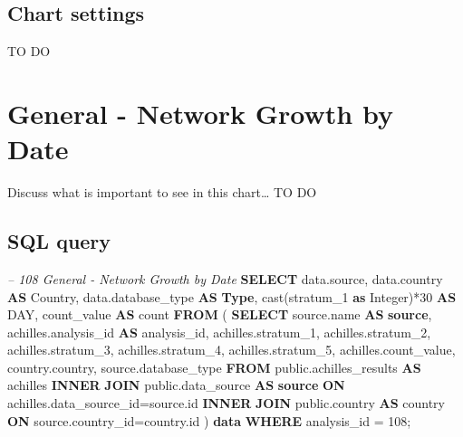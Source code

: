 \documentclass[]{book}
\newenvironment{Shaded}{\begin{snugshade}}{\end{snugshade}}
\newcommand{\KeywordTok}[1]{\textcolor[rgb]{0.13,0.29,0.53}{\textbf{#1}}}
\newcommand{\DataTypeTok}[1]{\textcolor[rgb]{0.13,0.29,0.53}{#1}}
\newcommand{\DecValTok}[1]{\textcolor[rgb]{0.00,0.00,0.81}{#1}}
\newcommand{\CommentTok}[1]{\textcolor[rgb]{0.56,0.35,0.01}{\textit{#1}}}
\newcommand{\FunctionTok}[1]{\textcolor[rgb]{0.00,0.00,0.00}{#1}}
\newcommand{\NormalTok}[1]{#1}
\begin{document}
\subsection{Chart settings}\label{chart-settings-3}

TO DO

\section{General - Network Growth by
Date}\label{general---network-growth-by-date}

Discuss what is important to see in this chart\ldots{} TO DO

\subsection{SQL query}\label{sql-query-4}

\begin{Shaded}
\begin{Highlighting}[]
\CommentTok{-- 108    General - Network Growth by Date}
\KeywordTok{SELECT}\NormalTok{ data.source,}
\NormalTok{       data.country }\KeywordTok{AS}\NormalTok{ Country,}
\NormalTok{       data.database_type }\KeywordTok{AS} \KeywordTok{Type}\NormalTok{,}
       \FunctionTok{cast}\NormalTok{(stratum_1 }\KeywordTok{as} \DataTypeTok{Integer}\NormalTok{)*}\DecValTok{30} \KeywordTok{AS} \DataTypeTok{DAY}\NormalTok{,}
\NormalTok{       count_value                   }\KeywordTok{AS} \FunctionTok{count}
\KeywordTok{FROM}\NormalTok{ (}
     \KeywordTok{SELECT}\NormalTok{ source.name              }\KeywordTok{AS} \KeywordTok{source}\NormalTok{,}
\NormalTok{            achilles.analysis_id     }\KeywordTok{AS}\NormalTok{ analysis_id,}
\NormalTok{            achilles.stratum_1,}
\NormalTok{            achilles.stratum_2,}
\NormalTok{            achilles.stratum_3,}
\NormalTok{            achilles.stratum_4,}
\NormalTok{            achilles.stratum_5,}
\NormalTok{            achilles.count_value,}
\NormalTok{            country.country,}
\NormalTok{            source.database_type}
     \KeywordTok{FROM}\NormalTok{ public.achilles_results }\KeywordTok{AS}\NormalTok{ achilles }\KeywordTok{INNER} \KeywordTok{JOIN} 
\NormalTok{        public.data_source }\KeywordTok{AS} \KeywordTok{source} \KeywordTok{ON} 
\NormalTok{        achilles.data_source_id=source.id}
     \KeywordTok{INNER} \KeywordTok{JOIN}\NormalTok{ public.country }\KeywordTok{AS}\NormalTok{ country }\KeywordTok{ON} 
\NormalTok{        source.country_id=country.id}
\NormalTok{     ) }\KeywordTok{data}
\KeywordTok{WHERE}\NormalTok{ analysis_id = }\DecValTok{108}\NormalTok{;}
\end{Highlighting}
\end{Shaded}
\end{document}
